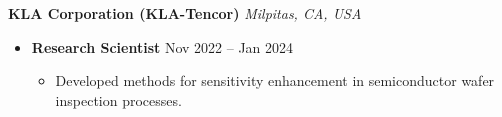 {\color{black}\textbf{KLA Corporation (KLA-Tencor)} \hfill \textit{Milpitas, CA, USA}}\par
\begin{itemize}
    \item
        \textbf{Research Scientist}
        \hfill  {Nov 2022 -- Jan 2024} \par
        \begin{itemize}
            \item Developed methods for sensitivity enhancement in semiconductor wafer inspection processes. 
        \end{itemize}
\end{itemize}